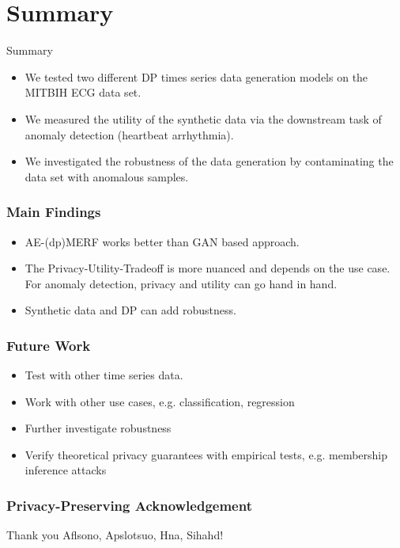 \section{Summary}
\begin{frame}{Summary}
    \begin{itemize}
        \item<1-> We tested two different \alert{DP times series data generation} models on the MITBIH ECG data set.
        \item<2-> We measured the \alert{utility} of the synthetic data via the downstream task of anomaly detection (heartbeat arrhythmia).
        \item<3-> We investigated the \alert{robustness} of the data generation by \alert{contaminating} the data set with anomalous samples.
    \end{itemize}
\end{frame}

\begin{frame}
    \frametitle{Main Findings}
        \begin{itemize}
            \item<1-> AE-(dp)MERF works better than GAN based approach.
            \item<2-> The \alert{Privacy-Utility-Tradeoff is more nuanced} and depends on the use case. For anomaly detection, privacy and utility can go hand in hand.
            \item<3-> Synthetic data and DP can add \alert{robustness}.
        \end{itemize}
\end{frame}

\begin{frame}
    \frametitle{Future Work}
    \begin{itemize}
        \item<1-> Test with \alert{other time series data}.
        \item<2-> Work with \alert{other use cases}, e.g. classification, regression
        \item<3-> Further investigate \alert{robustness}
        \item<4-> Verify theoretical privacy guarantees with empirical tests, e.g. \alert{membership inference attacks}
    \end{itemize}
\end{frame}

\begin{frame}
    \frametitle{Privacy-Preserving Acknowledgement}

    \huge
    Thank you Aflsono, Apslotsuo, Hna, Sihahd!
    

\end{frame}